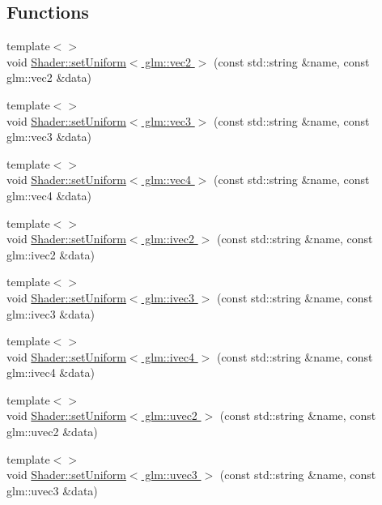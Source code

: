 \subsection*{Functions}
\begin{DoxyCompactItemize}
\item 
{\footnotesize template$<$$>$ }\\void \hyperlink{namespace_graphics_af654388f40d262319daa5a8225797dfd}{Shader\+::set\+Uniform$<$ glm\+::vec2 $>$} (const std\+::string \&name, const glm\+::vec2 \&data)
\item 
{\footnotesize template$<$$>$ }\\void \hyperlink{namespace_graphics_aab1ffbb4d50f91f85d85e5121d639836}{Shader\+::set\+Uniform$<$ glm\+::vec3 $>$} (const std\+::string \&name, const glm\+::vec3 \&data)
\item 
{\footnotesize template$<$$>$ }\\void \hyperlink{namespace_graphics_a6578817bc4a214e7ae41ef8da2dcf791}{Shader\+::set\+Uniform$<$ glm\+::vec4 $>$} (const std\+::string \&name, const glm\+::vec4 \&data)
\item 
{\footnotesize template$<$$>$ }\\void \hyperlink{namespace_graphics_a61e4cb878defa0a77abbaeb2a330dfae}{Shader\+::set\+Uniform$<$ glm\+::ivec2 $>$} (const std\+::string \&name, const glm\+::ivec2 \&data)
\item 
{\footnotesize template$<$$>$ }\\void \hyperlink{namespace_graphics_ab0f03955199219200abc2888a7c2bb6c}{Shader\+::set\+Uniform$<$ glm\+::ivec3 $>$} (const std\+::string \&name, const glm\+::ivec3 \&data)
\item 
{\footnotesize template$<$$>$ }\\void \hyperlink{namespace_graphics_a6907be695f98fa9dbf9f9f26c78f612b}{Shader\+::set\+Uniform$<$ glm\+::ivec4 $>$} (const std\+::string \&name, const glm\+::ivec4 \&data)
\item 
{\footnotesize template$<$$>$ }\\void \hyperlink{namespace_graphics_a3acfc53c36e7e856565d7c37e011368f}{Shader\+::set\+Uniform$<$ glm\+::uvec2 $>$} (const std\+::string \&name, const glm\+::uvec2 \&data)
\item 
{\footnotesize template$<$$>$ }\\void \hyperlink{namespace_graphics_a05a5218a49daf5984b1f52776318c402}{Shader\+::set\+Uniform$<$ glm\+::uvec3 $>$} (const std\+::string \&name, const glm\+::uvec3 \&data)
\item 

\end{DoxyCompactItemize}
